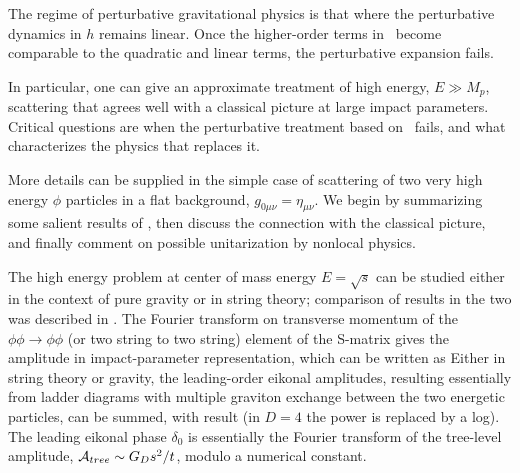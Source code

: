 The regime of perturbative gravitational physics is that where the perturbative dynamics in $h$ remains linear.  Once the higher-order terms in \gravpert\ become comparable to the quadratic and linear terms, the perturbative expansion fails.

In particular, one can give an approximate treatment of high energy, $E\gg M_p$, scattering that agrees well with a classical picture at large impact parameters.  Critical questions are when the perturbative treatment based on \gravpert\ fails, and what characterizes the physics that replaces it.



More details can be supplied in the simple case of scattering of two very high energy $\phi$ particles in a flat background, $g_{0\mu\nu}=\eta_{\mu\nu}$.  We begin by summarizing some salient results of 
, 
then discuss the connection with the classical picture, and finally comment on possible unitarization by nonlocal physics.  

The high energy problem  at center of mass energy $E=\sqrt s$ can be studied either in the context of pure gravity or in string theory; comparison of results in the two was described in .   The Fourier transform on transverse momentum of the $\phi\phi\rightarrow\phi\phi$ (or two string to two string) element of the S-matrix  gives the amplitude in impact-parameter representation, which can be written as
%
\eqn{}
%
Either in string theory or gravity, the leading-order eikonal amplitudes, resulting essentially from ladder diagrams with multiple graviton exchange between the two energetic particles, can be summed, with result
%
\eqn{}
%
(in $D=4$ the power is replaced by a log).  The leading eikonal phase $\delta_0$ is essentially the Fourier transform of the tree-level amplitude, ${\cal A}_{tree}\sim G_Ds^2/t$,
%
\eqn{}
%
modulo a numerical constant.


